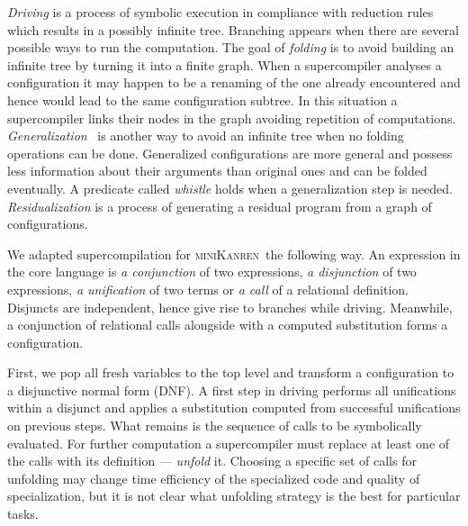 \documentclass[submission,copyright,creativecommons]{eptcs}
\newcommand{\miniKanren}{\textsc{miniKanren}\ }
\begin{document}
{\it  Driving} is a process of symbolic execution in compliance with reduction rules which results in a possibly infinite tree.
Branching appears when there are several possible ways to run the computation.
The goal of {\it folding} is to avoid building an infinite tree by turning it into a finite graph.
When a supercompiler analyses a configuration it may happen to be a renaming of the one already encountered and hence
would lead to the same configuration subtree.
In this situation a supercompiler links their nodes in the graph avoiding repetition of computations.
{\it Generalization}~\cite{generalize} is another way to avoid an infinite tree when no folding operations can be done.
Generalized configurations are more general and possess less information about their arguments than original ones
and can be folded eventually.
A predicate called {\it whistle} holds when a generalization step is needed.
{\it Residualization} is a process of generating a residual program from a graph of configurations.

We adapted supercompilation for \miniKanren the following way.
An expression in the core language is {\it a conjunction} of two expressions, {\it a disjunction} of two expressions, {\it a unification}
of two terms or {\it a call} of a relational definition.
Disjuncts are independent, hence give rise to branches while driving.
Meanwhile, a conjunction of relational calls alongside with a computed substitution forms a configuration.

First, we pop all fresh variables to the top level and transform a configuration to a disjunctive normal form (DNF).
A first step in driving performs all unifications within a disjunct and applies a substitution computed
from successful unifications on previous steps.
What remains is the sequence of calls to be symbolically evaluated.
For further computation a supercompiler must replace at least one of the calls with its definition --- {\it unfold} it.
Choosing a specific set of calls for unfolding may change time efficiency of the specialized code and quality of specialization,
but it is not clear
what unfolding strategy is the best for particular tasks.
\end{document}
